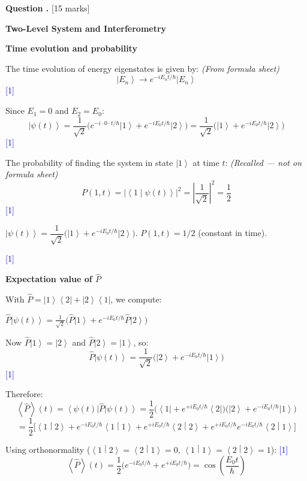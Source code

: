 \documentclass[12pt,a4paper]{article}
\newcounter{questioncounter}
\newcommand{\question}[1]{%
  \stepcounter{questioncounter}%
  \vspace{0.5cm}%
  \noindent\textbf{Question \thequestioncounter.} \hfill [#1 marks]%
  \vspace{0.2cm}%
  \par%
}
\newcommand{\markstep}[1]{\hfill\textcolor{blue}{[#1]}}
\newcommand{\finalanswer}[1]{%
  \begin{tcolorbox}[colback=green!5!white,colframe=green!50!black,boxrule=0.5pt]
  #1
  \end{tcolorbox}
}
\newcommand{\fromsheet}{\textit{(From formula sheet)}}
\newcommand{\recalled}{\textit{(Recalled --- not on formula sheet)}}
\renewcommand{\ket}[1]{\left|#1\right\rangle}
\renewcommand{\bra}[1]{\left\langle #1\right|}
\renewcommand{\braket}[2]{\left\langle #1\middle|#2\right\rangle}
\renewcommand{\ketbra}[2]{\left|#1\right\rangle\!\left\langle #2\right|}
\renewcommand{\expect}[1]{\left\langle #1\right\rangle}
\begin{document}
\newpage

\question{15}

\noindent\textbf{Two-Level System and Interferometry}

\begin{parts}

\item \textbf{Time evolution and probability} 

The time evolution of energy eigenstates is given by: \fromsheet
\[
\ket{E_n} \to e^{-iE_n t/\hbar}\ket{E_n}
\]
\markstep{1}

Since $E_1 = 0$ and $E_2 = E_0$:
\[
\ket{\psi(t)} = \frac{1}{\sqrt{2}}\bigl(e^{-i\cdot 0\cdot t/\hbar}\ket{1} + e^{-iE_0 t/\hbar}\ket{2}\bigr) = \frac{1}{\sqrt{2}}\bigl(\ket{1} + e^{-iE_0 t/\hbar}\ket{2}\bigr)
\]
\markstep{1}

The probability of finding the system in state $\ket{1}$ at time $t$: \recalled
\[
P(1,t) = \bigl|\braket{1}{\psi(t)}\bigr|^2 = \left|\frac{1}{\sqrt{2}}\right|^2 = \frac{1}{2}
\]
\markstep{1}

\finalanswer{$\ket{\psi(t)} = \dfrac{1}{\sqrt{2}}\bigl(\ket{1} + e^{-iE_0 t/\hbar}\ket{2}\bigr)$. \quad $P(1,t) = 1/2$ (constant in time).}
\markstep{1}

\item \textbf{Expectation value of $\hat{P}$} 

With $\hat{P} = \ketbra{1}{2} + \ketbra{2}{1}$, we compute:

$\hat{P}\ket{\psi(t)} = \frac{1}{\sqrt{2}}\bigl(\hat{P}\ket{1} + e^{-iE_0 t/\hbar}\hat{P}\ket{2}\bigr)$

Now $\hat{P}\ket{1} = \ket{2}$ and $\hat{P}\ket{2} = \ket{1}$, so:
\[
\hat{P}\ket{\psi(t)} = \frac{1}{\sqrt{2}}\bigl(\ket{2} + e^{-iE_0 t/\hbar}\ket{1}\bigr)
\]
\markstep{1}

Therefore:
\[
\expect{\hat{P}}(t) = \bra{\psi(t)}\hat{P}\ket{\psi(t)} = \frac{1}{2}\bigl(\bra{1} + e^{+iE_0 t/\hbar}\bra{2}\bigr)\bigl(\ket{2} + e^{-iE_0 t/\hbar}\ket{1}\bigr)
\]
\[
= \frac{1}{2}\bigl[\braket{1}{2} + e^{-iE_0 t/\hbar}\braket{1}{1} + e^{+iE_0 t/\hbar}\braket{2}{2} + e^{+iE_0 t/\hbar}e^{-iE_0 t/\hbar}\braket{2}{1}\bigr]
\]

Using orthonormality ($\braket{1}{2}=\braket{2}{1}=0$, $\braket{1}{1}=\braket{2}{2}=1$): \markstep{1}
\[
\expect{\hat{P}}(t) = \frac{1}{2}\bigl(e^{-iE_0 t/\hbar} + e^{+iE_0 t/\hbar}\bigr) = \cos\!\left(\frac{E_0 t}{\hbar}\right)
\]


\end{parts}
\end{document}

